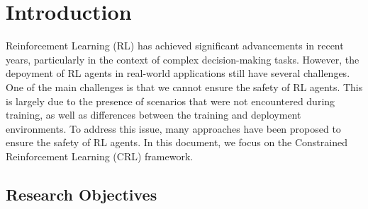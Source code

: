

\section{Introduction}

Reinforcement Learning (RL) has achieved significant advancements in recent years, particularly in the context of complex decision-making tasks.
However, the depoyment of RL agents in real-world applications still have several challenges.
One of the main challenges is that we cannot ensure the safety of RL agents.
This is largely due to the presence of scenarios that were not encountered during training, as well as differences between the training and deployment environments.
To address this issue, many approaches have been proposed to ensure the safety of RL agents.
In this document, we focus on the Constrained Reinforcement Learning (CRL) framework.

\subsection{Research Objectives}

